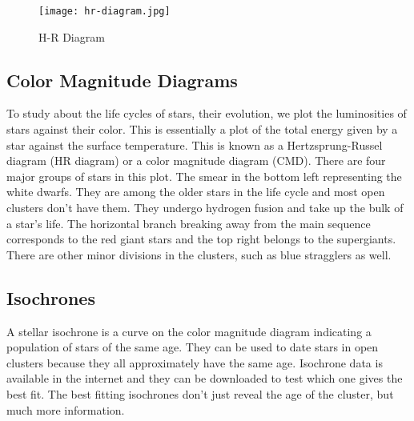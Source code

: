 \begin{figure}[H]
	\centering
	\texttt{[image: hr-diagram.jpg]}
	\caption{H-R Diagram \citep{wimecommons}}
	\label{fig:image3}
\end{figure}

\subsection{Color Magnitude Diagrams}
To study about the life cycles of stars, their evolution, we plot the luminosities of stars against their color. This is essentially a plot of the total energy given by a star against the surface temperature. This is known as a Hertzsprung-Russel diagram (HR diagram) or a color magnitude diagram (CMD). There are four major groups of stars in this plot. The smear in the bottom left representing the white dwarfs. They are among the older stars in the life cycle and most open clusters don't have them. They undergo hydrogen fusion and take up the bulk of a star's life. The horizontal branch breaking away from the main sequence corresponds to the red giant stars and the top right belongs to the supergiants. There are other minor divisions in the clusters, such as blue stragglers as well.  \citep{introstars}

\subsection{Isochrones}
A stellar isochrone is a curve on the color magnitude diagram indicating a population of stars of the same age. They can be used to date stars in open clusters because they all approximately have the same age. Isochrone data is available in the internet and they can be downloaded to test which one gives the best fit. The best fitting isochrones don't just reveal the age of the cluster, but much more information.



